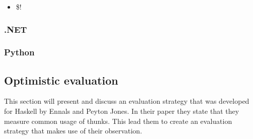 \begin{itemize}
\item \$!
\end{itemize}

\subsubsection{.NET}

\subsubsection{Python}

\subsection{Optimistic evaluation}

This section will present and discuss an evaluation strategy that was developed
for Haskell by Ennals and Peyton Jones. In their paper they state that they
measure common usage of thunks. This lead them to create an evaluation strategy
that makes use of their observation. 

